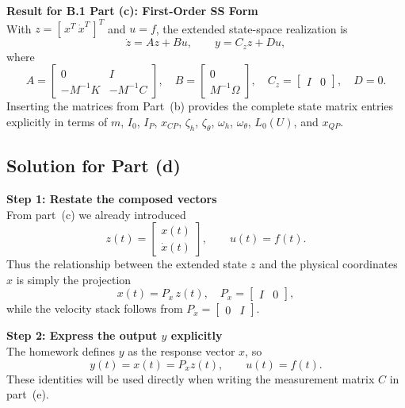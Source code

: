 \documentclass[12pt]{article}
\begin{document}
\begin{resultsbox}
\textbf{Result for B.1 Part (c): First-Order SS Form}\\[0.5em]
With $z = [\,x^T \ \dot{x}^T\,]^T$ and $u = f$, the extended state-space realization is
\[
\dot{z} = A z + B u, \qquad y = C_z z + D u,
\]
where
\[
A = \begin{bmatrix}
0 & I \\
-M^{-1}K & -M^{-1}C
\end{bmatrix}, \quad
B = \begin{bmatrix}
0 \\
M^{-1}\Omega
\end{bmatrix}, \quad
C_z = \begin{bmatrix}
I & 0
\end{bmatrix}, \quad
D = 0.
\]
Inserting the matrices from Part~(b) provides the complete state matrix entries explicitly in terms of $m$, $I_0$, $I_P$, $x_{CP}$, $\zeta_h$, $\zeta_\theta$, $\omega_h$, $\omega_\theta$, $L_0(U)$, and $x_{QP}$.
\end{resultsbox}

\subsection*{Solution for Part (d)}

\begin{stepbox}
\textbf{Step 1: Restate the composed vectors}\\[0.5em]
From part~(c) we already introduced
\[
z(t) = \begin{bmatrix} x(t) \\ \dot{x}(t) \end{bmatrix}, \qquad
u(t) = f(t).
\]
Thus the relationship between the extended state $z$ and the physical coordinates $x$ is simply the projection
\[
x(t) = P_x\,z(t), \quad P_x = \begin{bmatrix} I & 0 \end{bmatrix},
\]
while the velocity stack follows from $P_{\dot{x}} = \begin{bmatrix} 0 & I \end{bmatrix}$.
\end{stepbox}

\begin{stepbox}
\textbf{Step 2: Express the output $y$ explicitly}\\[0.5em]
The homework defines $y$ as the response vector $x$, so
\[
y(t) = x(t) = P_x z(t), \qquad u(t) = f(t).
\]
These identities will be used directly when writing the measurement matrix $C$ in part~(e).
\end{stepbox}
\end{document}
